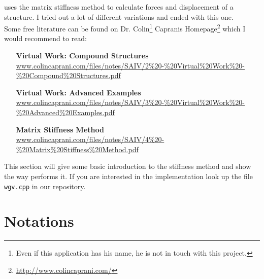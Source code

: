 \Colin uses the matrix stiffness method to calculate forces and displacement of a structure. I tried out a lot of different variations and ended with this one.\\
Some free literature can be found on Dr. Colin\footnote{Even if this application has his name, he is not in touch with this project.} Capranis Homepage\footnote{\url{http://www.colincaprani.com/}} which I would recommend to read: 
\begin{itemize}
	\item[\textbf{Virtual Work: Compound Structures}] \\\url{www.colincaprani.com/files/notes/SAIV/2%20-%20Virtual%20Work%20-%20Compound%20Structures.pdf}
	\item[\textbf{Virtual Work: Advanced Examples}] \\\url{www.colincaprani.com/files/notes/SAIV/3%20-%20Virtual%20Work%20-%20Advanced%20Examples.pdf}
	\item[\textbf{Matrix Stiffness Method}] \\\url{www.colincaprani.com/files/notes/SAIV/4%20-%20Matrix%20Stiffness%20Method.pdf}
\end{itemize}

This section will give some basic introduction to the stiffness method and show the way \Colin performs it. If you are interested in the implementation look up the file \texttt{wgv.cpp} in our repository.


\section{Notations}

